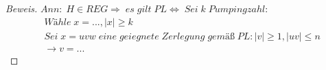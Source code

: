 \begin{proof}[Beweis]
	\begin{math}
		Ann:\;H\in REG\Rightarrow\;es\;gilt\;PL\Leftrightarrow\;Sei\;k\;Pumpingzahl:
	\end{math}
	\begin{align*}
		&Wähle\;x=...,\mid x\mid\ge k\\
		&Sei\;x=uvw\;eine\;geiegnete\;Zerlegung\;gemäß\;PL:\mid v\mid\ge1,\mid uv\mid\le n\\
		&\rightarrow v=...
	\end{align*}
\end{proof}